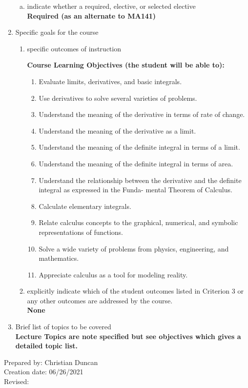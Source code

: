 \begin{enumerate}[1.]
\begin{enumerate}[a.]
\item indicate whether a required, elective, or selected elective\\ %
  {\bfseries
    Required (as an alternate to MA141)
  }

\end{enumerate}

\item Specific goals for the course
\begin{enumerate}
\item specific outcomes of instruction\\ %
  {\bfseries
    Course Learning Objectives (the student will be able to):
    \begin{enumerate}[1.]
\item Evaluate limits, derivatives, and basic integrals.
\item Use derivatives to solve several varieties of problems.
\item Understand the meaning of the derivative in terms of rate of change.
\item Understand the meaning of the derivative as a limit.
\item Understand the meaning of the definite integral in terms of a limit.
\item Understand the meaning of the definite integral in terms of area.
\item Understand the relationship between the derivative and the definite integral as expressed in the Funda-
mental Theorem of Calculus.
\item Calculate elementary integrals.
\item Relate calculus concepts to the graphical, numerical, and symbolic representations of functions.
\item Solve a wide variety of problems from physics, engineering, and mathematics.
\item Appreciate calculus as a tool for modeling reality.
    \end{enumerate}
  }

\item explicitly indicate which of the student outcomes listed in Criterion 3 or any other outcomes are addressed by the course.\\
  {\bfseries
    None
  }
\end{enumerate}

\item Brief list of topics to be covered\\
  {\bfseries
    Lecture Topics are note specified but see objectives which gives a detailed topic list.
  }

\end{enumerate}

\noindent Prepared by: Christian Duncan\\
\noindent Creation date: 06/26/2021\\
\noindent Revised:\\
